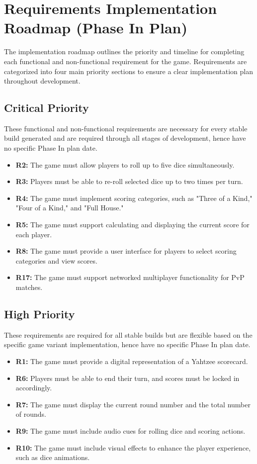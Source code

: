 \newpage
\section{Requirements Implementation Roadmap (Phase In Plan)}

The implementation roadmap outlines the priority and timeline for completing each functional and non-functional requirement for the game. Requirements are categorized into four main priority sections to ensure a clear implementation plan throughout development.

\subsection{Critical Priority}
These functional and non-functional requirements are necessary for every stable build generated and are required through all stages of development, hence have no specific Phase In plan date.
\begin{itemize}
    \item \textbf{R2:} The game must allow players to roll up to five dice simultaneously.
    \item \textbf{R3:} Players must be able to re-roll selected dice up to two times per turn.
    \item \textbf{R4:} The game must implement scoring categories, such as "Three of a Kind," "Four of a Kind," and "Full House."
    \item \textbf{R5:} The game must support calculating and displaying the current score for each player.
    \item \textbf{R8:} The game must provide a user interface for players to select scoring categories and view scores.
    \item \textbf{R17:} The game must support networked multiplayer functionality for PvP matches.
\end{itemize}

\subsection{High Priority}
These requirements are required for all stable builds but are flexible based on the specific game variant implementation, hence have no specific Phase In plan date.
\begin{itemize}
    \item \textbf{R1:} The game must provide a digital representation of a Yahtzee scorecard.
    \item \textbf{R6:} Players must be able to end their turn, and scores must be locked in accordingly.
    \item \textbf{R7:} The game must display the current round number and the total number of rounds.
    \item \textbf{R9:} The game must include audio cues for rolling dice and scoring actions.
    \item \textbf{R10:} The game must include visual effects to enhance the player experience, such as dice animations.
\end{itemize}

